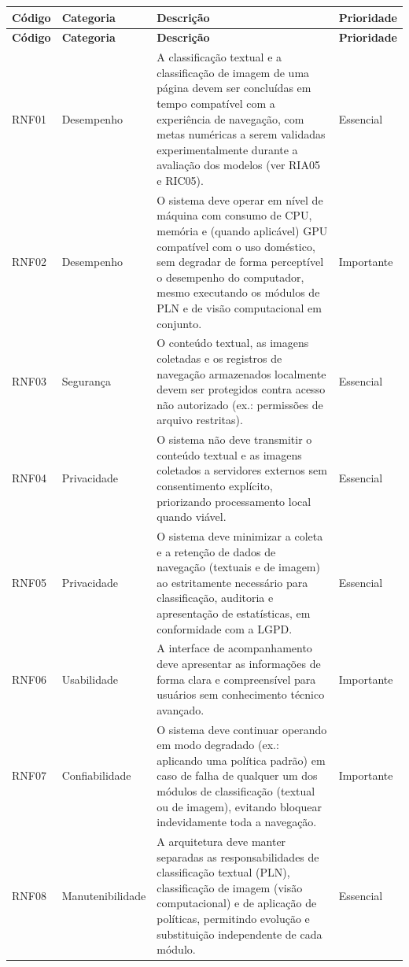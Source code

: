 \documentclass[
    12pt,           %
    oneside,        %
    a4paper,        %
    chapter=TITLE,  %
    english,        %
    brazil          %
]{abntex2}
\begin{document}
\begin{longtable}{|p{1.5cm}|p{3.2cm}|p{6.8cm}|p{2.2cm}|}
\hline
\textbf{Código} & \textbf{Categoria} & \textbf{Descrição} & \textbf{Prioridade} \\ \hline
\endfirsthead
\hline
\textbf{Código} & \textbf{Categoria} & \textbf{Descrição} & \textbf{Prioridade} \\ \hline
\endhead

RNF01 & Desempenho & A classificação textual e a classificação de imagem de uma página devem ser concluídas em tempo compatível com a experiência de navegação, com metas numéricas a serem validadas experimentalmente durante a avaliação dos modelos (ver RIA05 e RIC05). & Essencial \\ \hline
RNF02 & Desempenho & O sistema deve operar em nível de máquina com consumo de CPU, memória e (quando aplicável) GPU compatível com o uso doméstico, sem degradar de forma perceptível o desempenho do computador, mesmo executando os módulos de PLN e de visão computacional em conjunto. & Importante \\ \hline
RNF03 & Segurança & O conteúdo textual, as imagens coletadas e os registros de navegação armazenados localmente devem ser protegidos contra acesso não autorizado (ex.: permissões de arquivo restritas). & Essencial \\ \hline
RNF04 & Privacidade & O sistema não deve transmitir o conteúdo textual e as imagens coletados a servidores externos sem consentimento explícito, priorizando processamento local quando viável. & Essencial \\ \hline
RNF05 & Privacidade & O sistema deve minimizar a coleta e a retenção de dados de navegação (textuais e de imagem) ao estritamente necessário para classificação, auditoria e apresentação de estatísticas, em conformidade com a LGPD. & Essencial \\ \hline
RNF06 & Usabilidade & A interface de acompanhamento deve apresentar as informações de forma clara e compreensível para usuários sem conhecimento técnico avançado. & Importante \\ \hline
RNF07 & Confiabilidade & O sistema deve continuar operando em modo degradado (ex.: aplicando uma política padrão) em caso de falha de qualquer um dos módulos de classificação (textual ou de imagem), evitando bloquear indevidamente toda a navegação. & Importante \\ \hline
RNF08 & Manutenibilidade & A arquitetura deve manter separadas as responsabilidades de classificação textual (PLN), classificação de imagem (visão computacional) e de aplicação de políticas, permitindo evolução e substituição independente de cada módulo. & Essencial \\ \hline

\end{longtable}
\end{document}

